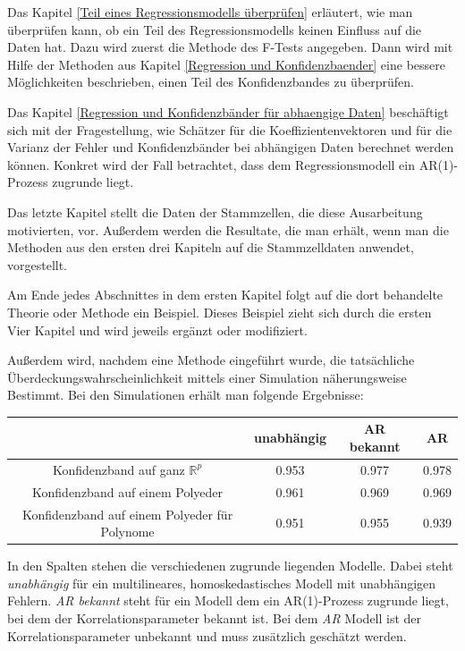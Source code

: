 \documentclass[12pt,a4paper]{article}
\theoremstyle{definition}
\theoremstyle{definition}
\theoremstyle{definition}
\theoremstyle{definition}
\newcommand{\UeberRR}{0.953}
\newcommand{\UeberRMinmax}{0.961}
\newcommand{\UeberRMinmaxPolyfast}{0.951}
\newcommand{\UeberARbekanntR}{0.977}
\newcommand{\UeberARbekanntMinmax}{0.969}
\newcommand{\UeberARbekanntMinmaxPolyfast}{0.955}
\newcommand{\UeberARR}{0.978}
\newcommand{\UeberARMinmax}{0.969}
\newcommand{\UeberARMinmaxPolyfast}{0.939}
\begin{document}
Das Kapitel \ref{Teil eines Regressionsmodells überprüfen} erläutert, wie man überprüfen kann, ob ein Teil des Regressionsmodells keinen Einfluss auf die Daten hat. Dazu wird zuerst die Methode des F-Tests angegeben. Dann wird mit Hilfe der Methoden aus Kapitel \ref{Regression und Konfidenzbaender} eine bessere Möglichkeiten beschrieben, einen Teil des Konfidenzbandes zu überprüfen.

Das Kapitel \ref{Regression und Konfidenzbänder für abhaengige Daten} beschäftigt sich mit der Fragestellung, wie Schätzer für die Koeffizientenvektoren und für die Varianz der Fehler und Konfidenzbänder bei abhängigen Daten berechnet werden können. Konkret wird der Fall betrachtet, dass dem Regressionsmodell ein AR(1)-Prozess zugrunde liegt.

Das letzte Kapitel stellt die Daten der Stammzellen, die diese Ausarbeitung motivierten, vor. Außerdem werden die Resultate, die man erhält, wenn man die Methoden aus den ersten drei Kapiteln auf die Stammzelldaten anwendet, vorgestellt.

Am Ende jedes Abschnittes in dem ersten Kapitel folgt auf die dort behandelte Theorie oder Methode ein Beispiel. Dieses Beispiel zieht sich durch die ersten Vier Kapitel und wird jeweils ergänzt oder modifiziert.

Außerdem wird, nachdem eine Methode eingeführt wurde, die tatsächliche Überdeckungswahrscheinlichkeit mittels einer Simulation näherungsweise Bestimmt. Bei den Simulationen erhält man folgende Ergebnisse:

\begin{center}
\begin{tabular}{|c|c|c|c|}
\hline 
 & unabhängig & AR bekannt & AR \\ 
\hline 
Konfidenzband auf ganz $\mathbb{R}^{p}$		 & \UeberRR		  & \UeberARbekanntR & \UeberARR \\ 
\hline 
Konfidenzband auf einem Polyeder	 & \UeberRMinmax  & \UeberARbekanntMinmax & \UeberARMinmax \\ 
\hline 
Konfidenzband auf einem Polyeder für Polynome  & \UeberRMinmaxPolyfast & \UeberARbekanntMinmaxPolyfast & \UeberARMinmaxPolyfast \\ 
\hline 
\end{tabular} 
\end{center}

In den Spalten stehen die verschiedenen zugrunde liegenden Modelle. Dabei steht \textit{unabhängig} für ein  multilineares, homoskedastisches Modell mit unabhängigen Fehlern. \textit{AR bekannt} steht für ein Modell dem ein AR(1)-Prozess zugrunde liegt, bei dem der Korrelationsparameter bekannt ist. Bei dem \textit{AR} Modell ist der Korrelationsparameter unbekannt und muss zusätzlich geschätzt werden.
\end{document}
